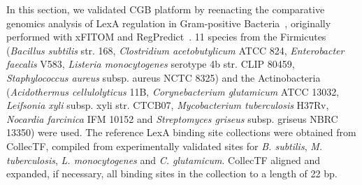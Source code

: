 In this section, we validated CGB platform by reenacting the comparative
genomics analysis of LexA regulation in Gram-positive
Bacteria~\cite{cornish2012inference}, originally performed with xFITOM and
RegPredict~\cite{bhargava2010xfitom, novichkov2010regpredict}. 11 species from
the Firmicutes (\textit{Bacillus subtilis} str. 168, \textit{Clostridium
  acetobutylicum} ATCC 824, \textit{Enterobacter faecalis} V583,
\textit{Listeria monocytogenes} serotype 4b str. CLIP 80459,
\textit{Staphylococcus aureus} subsp. aureus NCTC 8325) and the Actinobacteria
(\textit{Acidothermus cellulolyticus} 11B, \textit{Corynebacterium glutamicum}
ATCC 13032, \textit{Leifsonia xyli} subsp. xyli str. CTCB07,
\textit{Mycobacterium tuberculosis} H37Rv, \textit{Nocardia farcinica} IFM
10152 and \textit{Streptomyces griseus} subsp. griseus NBRC 13350) were
used. The reference LexA binding site collections were obtained from CollecTF, compiled
from experimentally validated sites for \textit{B. subtilis},
\textit{M. tuberculosis}, \textit{L. monocytogenes} and
\textit{C. glutamicum}. CollecTF aligned and expanded, if necessary, all
binding sites in the collection to a length of 22 bp.

